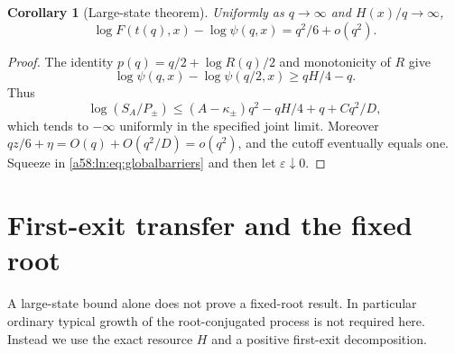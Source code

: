 \documentclass[11pt,letterpaper]{article}
\newtheorem{corollary}[theorem]{Corollary}
\theoremstyle{remark}
\begin{document}
\begin{corollary}[Large-state theorem]\label{a58:ln:cor:largestates}
Uniformly as $q\to\infty$ and $H(x)/q\to\infty$,
\begin{equation}\label{a58:ln:eq:largestates}
 \log F(t(q),x)-\log\psi(q,x)=q^2/6+o(q^2).
\end{equation}
\end{corollary}
\begin{proof}
The identity $p(q)=q/2+\log R(q)/2$ and monotonicity of $R$ give
\begin{equation}\label{a58:ln:eq:slowratio}
 \log\psi(q,x)-\log\psi(q/2,x)\ge qH/4-q.
\end{equation}
Thus
\[
 \log(S_A/P_\pm)\le(A-\kappa_\pm)q^2-qH/4+q+Cq^2/D,
\]
which tends to $-\infty$ uniformly in the specified joint limit.
Moreover $qz/6+\eta=O(q)+O(q^2/D)=o(q^2)$, and the cutoff eventually
equals one. Squeeze in \eqref{a58:ln:eq:globalbarriers} and then let
$\varepsilon\downarrow0$.
\end{proof}

\section{First-exit transfer and the fixed root}\label{a58:ln:sec:root}
A large-state bound alone does not prove a fixed-root result. In
particular ordinary typical growth of the root-conjugated process is
not required here. Instead we use the exact resource $H$ and a positive
first-exit decomposition.
\end{document}
